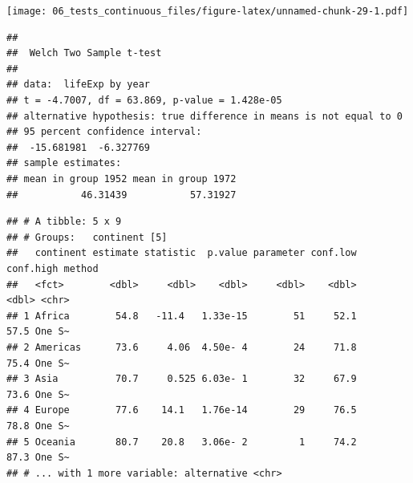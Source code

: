 \documentclass[12pt,]{krantz}
\makeatletter
\newenvironment{Shaded}{\begin{snugshade}}{\end{snugshade}}
\newcommand{\CommentTok}[1]{\textcolor[rgb]{0.56,0.35,0.01}{\textit{#1}}}
\newcommand{\DataTypeTok}[1]{\textcolor[rgb]{0.13,0.29,0.53}{#1}}
\newcommand{\DecValTok}[1]{\textcolor[rgb]{0.00,0.00,0.81}{#1}}
\newcommand{\KeywordTok}[1]{\textcolor[rgb]{0.13,0.29,0.53}{\textbf{#1}}}
\newcommand{\NormalTok}[1]{#1}
\newcommand{\OperatorTok}[1]{\textcolor[rgb]{0.81,0.36,0.00}{\textbf{#1}}}
\newcommand{\StringTok}[1]{\textcolor[rgb]{0.31,0.60,0.02}{#1}}
\newenvironment{kframe}{%
\medskip{}
\setlength{\fboxsep}{.8em}
 \def\at@end@of@kframe{}%
 \ifinner\ifhmode%
  \def\at@end@of@kframe{\end{minipage}}%
  \begin{minipage}{\columnwidth}%
 \fi\fi%
 \def\FrameCommand##1{\hskip\@totalleftmargin \hskip-\fboxsep
 \colorbox{shadecolor}{##1}\hskip-\fboxsep
     \hskip-\linewidth \hskip-\@totalleftmargin \hskip\columnwidth}%
 \MakeFramed {\advance\hsize-\width
   \@totalleftmargin\z@ \linewidth\hsize
   \@setminipage}}%
 {\par\unskip\endMakeFramed%
 \at@end@of@kframe}
\renewenvironment{Shaded}{\begin{kframe}}{\end{kframe}}
\theoremstyle{definition}
\theoremstyle{definition}
\theoremstyle{definition}
\theoremstyle{remark}
\makeatother
\begin{document}
\texttt{[image: 06\_tests\_continuous\_files/figure-latex/unnamed-chunk-29-1.pdf]}

\begin{Shaded}
\end{Shaded}

\begin{verbatim}
## 
##  Welch Two Sample t-test
## 
## data:  lifeExp by year
## t = -4.7007, df = 63.869, p-value = 1.428e-05
## alternative hypothesis: true difference in means is not equal to 0
## 95 percent confidence interval:
##  -15.681981  -6.327769
## sample estimates:
## mean in group 1952 mean in group 1972 
##           46.31439           57.31927
\end{verbatim}

\begin{Shaded}
\end{Shaded}

\begin{verbatim}
## # A tibble: 5 x 9
## # Groups:   continent [5]
##   continent estimate statistic  p.value parameter conf.low conf.high method
##   <fct>        <dbl>     <dbl>    <dbl>     <dbl>    <dbl>     <dbl> <chr> 
## 1 Africa        54.8   -11.4   1.33e-15        51     52.1      57.5 One S~
## 2 Americas      73.6     4.06  4.50e- 4        24     71.8      75.4 One S~
## 3 Asia          70.7     0.525 6.03e- 1        32     67.9      73.6 One S~
## 4 Europe        77.6    14.1   1.76e-14        29     76.5      78.8 One S~
## 5 Oceania       80.7    20.8   3.06e- 2         1     74.2      87.3 One S~
## # ... with 1 more variable: alternative <chr>
\end{verbatim}
\end{document}
